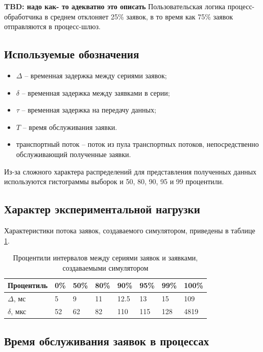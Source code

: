 \textbf{TBD: надо как- то адекватно это описать}
Пользовательская логика процесс-обработчика в среднем отклоняет 25\% заявок, в то время как 75\% заявок отправляются в процесс-шлюз.

\subsection{Используемые обозначения}

\begin{itemize}
\item $\Delta$ -- временная задержка между сериями заявок;
\item $\delta$ -- временная задержка между заявками в серии;
\item $\tau$ -- временная задержка на передачу данных;
\item $T$ -- время обслуживания заявки.
\item транспортный поток -- поток из пула транспортных потоков, непосредственно обслуживающий полученные заявки.
\end{itemize}

Из-за сложного характера распределений для представления полученных данных используются гистограммы выборок и 50, 80, 90, 95 и 99 процентили.

\subsection{Характер экспериментальной нагрузки}

Характеристики потока заявок, создаваемого симулятором, приведены в таблице \ref{chapter41:TableSimulator}.
\begin{table}[!h]
\caption{Процентили интервалов между сериями заявок и заявками, создаваемыми симулятором}\label{chapter41:TableSimulator}
\centering
\begin{tabular}{|l|l|l|l|l|l|l|l|}
\hline
Процентиль & 0\% & 50\% & 80\% & 90\% & 95\% & 99\% & 100\% \\ \hline
$\Delta$, мс & 5 & 9 & 11 & 12.5 & 13 & 15 & 109 \\ \hline
$\delta$, мкс & 52 & 62 & 82 & 110 & 115 & 128 & 4819 \\ \hline
\end{tabular}
\end{table}

\subsection{Время обслуживания заявок в процессах}

